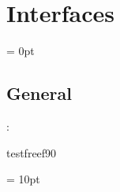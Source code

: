 
\section{Interfaces} 


\parskip = 0pt

\vspace{3mm} \subsection*{General}

: 

testfreef90
\vspace{2mm}

\vspace{5mm}\parskip = 10pt 
